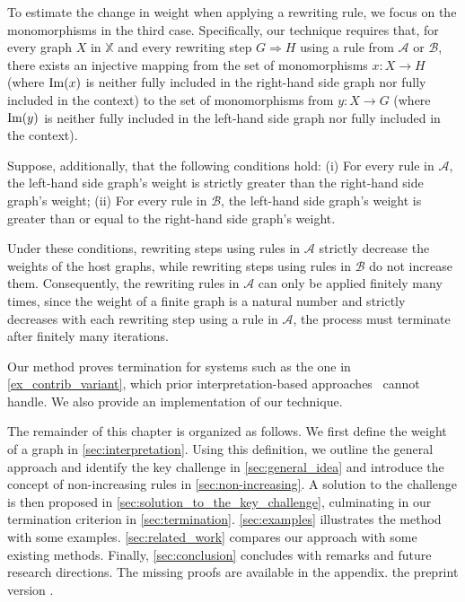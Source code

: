 To estimate the change in weight when applying a rewriting rule, we focus on 
the monomorphisms in the third case. Specifically, our technique requires that, for every graph $X$ in $\mathbb{X}$ and every rewriting step $G \Rightarrow H$ using a rule from $\mathcal{A}$ or $\mathcal{B}$, there exists an injective mapping from the set of monomorphisms $x : X \to H$ (where $\operatorname{Im}(x)$ is neither fully included in the right-hand side graph nor fully included in the context) to the set of monomorphisms from $y : X \to G$ (where $\operatorname{Im}(y)$ is neither fully included in the left-hand side graph nor fully included in the context). 

Suppose, additionally, that the following conditions hold: (i) For every rule in \( \mathcal{A} \), the left-hand side graph's weight is strictly greater than the right-hand side graph's weight; (ii) For every rule in \( \mathcal{B} \), the left-hand side graph's weight is greater than or equal to the right-hand side graph's weight. 

Under these conditions, rewriting steps using rules in \( \mathcal{A} \) strictly decrease the weights of the host graphs, while rewriting steps using rules in \( \mathcal{B} \) do not increase them.
Consequently, the rewriting rules in \( \mathcal{A} \) can only be applied finitely many times, since the weight of a finite graph is a natural number and strictly decreases with each rewriting step using a rule in \( \mathcal{A} \), the process must terminate after finitely many iterations.  
 
Our method proves termination for systems such as the one in \autoref{ex_contrib_variant}, which prior interpretation-based approaches~\cite{zantema2014termination,bruggink2014termination,bruggink2015proving,
endrullis2024generalized_arxiv_v2,
overbeek2024termination_lmcs} cannot handle. 
We also provide an implementation of our technique.  
   
The remainder of this chapter is organized as follows.
We first define the weight of a graph in \autoref{sec:interpretation}. 
Using this definition, we outline the general approach and identify the key challenge in \autoref{sec:general_idea} and introduce the concept of non-increasing rules in \autoref{sec:non-increasing}. 
A solution to the challenge is then proposed in \autoref{sec:solution_to_the_key_challenge}, culminating in our termination criterion in \autoref{sec:termination}.
\autoref{sec:examples} illustrates the method with some examples.
\autoref{sec:related_work} compares our approach with some existing methods.
Finally, \autoref{sec:conclusion} concludes with remarks and future research directions. The missing proofs are available in 
\iflongversion
the appendix.
\else
the preprint version \cite{qiu2025termination}.
\fi